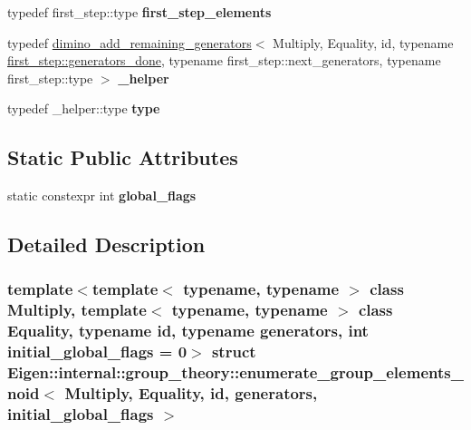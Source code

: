 \begin{DoxyCompactItemize}
\item 
\mbox{\label{struct_eigen_1_1internal_1_1group__theory_1_1enumerate__group__elements__noid_ae4cf13c8f6fc01f9e4ef3325a7f60435}} 
typedef first\+\_\+step\+::type {\bfseries first\+\_\+step\+\_\+elements}
\item 
\mbox{\label{struct_eigen_1_1internal_1_1group__theory_1_1enumerate__group__elements__noid_a174551f0396f06c2185c642acedb7dfa}} 
typedef \hyperlink{struct_eigen_1_1internal_1_1group__theory_1_1dimino__add__remaining__generators}{dimino\+\_\+add\+\_\+remaining\+\_\+generators}$<$ Multiply, Equality, id, typename \hyperlink{struct_eigen_1_1internal_1_1type__list}{first\+\_\+step\+::generators\+\_\+done}, typename first\+\_\+step\+::next\+\_\+generators, typename first\+\_\+step\+::type $>$ {\bfseries \+\_\+helper}
\item 
\mbox{\label{struct_eigen_1_1internal_1_1group__theory_1_1enumerate__group__elements__noid_a81b4f08a5f43fc88459179b9bf587752}} 
typedef \+\_\+helper\+::type {\bfseries type}
\end{DoxyCompactItemize}
\subsection*{Static Public Attributes}
\begin{DoxyCompactItemize}
\item 
static constexpr int {\bfseries global\+\_\+flags}
\end{DoxyCompactItemize}


\subsection{Detailed Description}
\subsubsection*{template$<$template$<$ typename, typename $>$ class Multiply, template$<$ typename, typename $>$ class Equality, typename id, typename generators, int initial\+\_\+global\+\_\+flags = 0$>$\newline
struct Eigen\+::internal\+::group\+\_\+theory\+::enumerate\+\_\+group\+\_\+elements\+\_\+noid$<$ Multiply, Equality, id, generators, initial\+\_\+global\+\_\+flags $>$}



